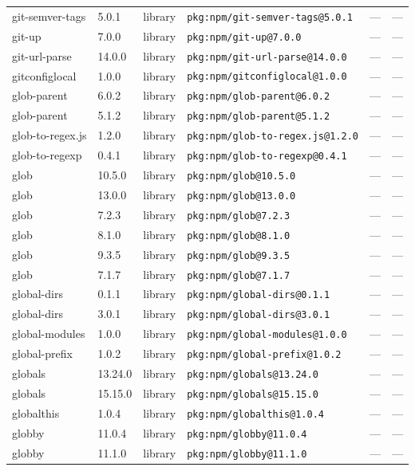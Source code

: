 \documentclass[11pt]{article}
\begin{document}
\begin{longtable}{|l|l|l|p{2.2cm}|l|p{4cm}|}
git-semver-tags & 5.0.1 & library & \texttt{pkg:npm/git-semver-tags@5.0.1} & — & — \\
git-up & 7.0.0 & library & \texttt{pkg:npm/git-up@7.0.0} & — & — \\
git-url-parse & 14.0.0 & library & \texttt{pkg:npm/git-url-parse@14.0.0} & — & — \\
gitconfiglocal & 1.0.0 & library & \texttt{pkg:npm/gitconfiglocal@1.0.0} & — & — \\
glob-parent & 6.0.2 & library & \texttt{pkg:npm/glob-parent@6.0.2} & — & — \\
glob-parent & 5.1.2 & library & \texttt{pkg:npm/glob-parent@5.1.2} & — & — \\
glob-to-regex.js & 1.2.0 & library & \texttt{pkg:npm/glob-to-regex.js@1.2.0} & — & — \\
glob-to-regexp & 0.4.1 & library & \texttt{pkg:npm/glob-to-regexp@0.4.1} & — & — \\
glob & 10.5.0 & library & \texttt{pkg:npm/glob@10.5.0} & — & — \\
glob & 13.0.0 & library & \texttt{pkg:npm/glob@13.0.0} & — & — \\
glob & 7.2.3 & library & \texttt{pkg:npm/glob@7.2.3} & — & — \\
glob & 8.1.0 & library & \texttt{pkg:npm/glob@8.1.0} & — & — \\
glob & 9.3.5 & library & \texttt{pkg:npm/glob@9.3.5} & — & — \\
glob & 7.1.7 & library & \texttt{pkg:npm/glob@7.1.7} & — & — \\
global-dirs & 0.1.1 & library & \texttt{pkg:npm/global-dirs@0.1.1} & — & — \\
global-dirs & 3.0.1 & library & \texttt{pkg:npm/global-dirs@3.0.1} & — & — \\
global-modules & 1.0.0 & library & \texttt{pkg:npm/global-modules@1.0.0} & — & — \\
global-prefix & 1.0.2 & library & \texttt{pkg:npm/global-prefix@1.0.2} & — & — \\
globals & 13.24.0 & library & \texttt{pkg:npm/globals@13.24.0} & — & — \\
globals & 15.15.0 & library & \texttt{pkg:npm/globals@15.15.0} & — & — \\
globalthis & 1.0.4 & library & \texttt{pkg:npm/globalthis@1.0.4} & — & — \\
globby & 11.0.4 & library & \texttt{pkg:npm/globby@11.0.4} & — & — \\
globby & 11.1.0 & library & \texttt{pkg:npm/globby@11.1.0} & — & — \\

\end{longtable}
\end{document}
